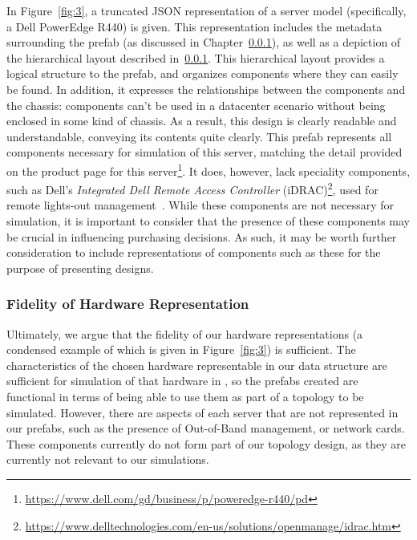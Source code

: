 \documentclass[11pt]{article}
\begin{document}
			In Figure~\ref{fig:3}, a truncated JSON representation of a server model (specifically, a Dell PowerEdge R440) is given.
			This representation includes the metadata surrounding the prefab (as discussed in Chapter~\ref{}), as well as a depiction of the hierarchical layout described in~\ref{}.
			This hierarchical layout provides a logical structure to the prefab, and organizes components where they can easily be found.
			In addition, it expresses the relationships between the components and the chassis: components can't be used in a datacenter scenario without being enclosed in some kind of chassis.
			As a result, this design is clearly readable and understandable, conveying its contents quite clearly.
			This prefab represents all components necessary for simulation of this server, matching the detail provided on the product page for this server\footnote{\url{https://www.dell.com/gd/business/p/poweredge-r440/pd}}.
			It does, however, lack speciality components, such as Dell's \textit{Integrated Dell Remote Access Controller} (iDRAC)\footnote{\url{https://www.delltechnologies.com/en-us/solutions/openmanage/idrac.htm}}, used for remote lights-out management~\cite{Bonkoski2013}.
			While these components are not necessary for simulation, it is important to consider that the presence of these components may be crucial in influencing purchasing decisions.
			As such, it may be worth further consideration to include representations of components such as these for the purpose of presenting designs.



		\subsubsection{Fidelity of Hardware Representation}
			Ultimately, we argue that the fidelity of our hardware representations (a condensed example of which is given in Figure~\ref{fig:3}) is sufficient.
			The characteristics of the chosen hardware representable in our data structure are sufficient for simulation of that hardware in \opendc{}, so the prefabs created are functional in terms of being able to use them as part of a topology to be simulated.
			However, there are aspects of each server that are not represented in our prefabs, such as the presence of Out-of-Band management, or network cards.
			These components currently do not form part of our topology design, as they are currently not relevant to our simulations.
\end{document}
